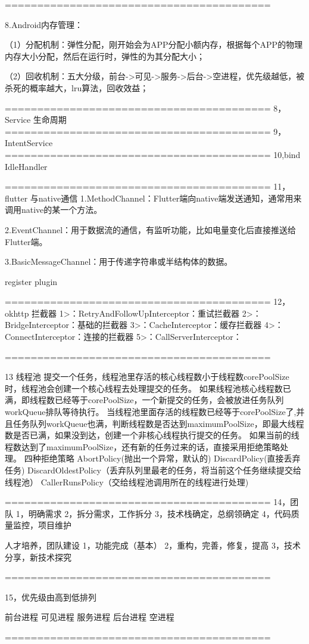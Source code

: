  =========================================

8.Android内存管理：

（1）分配机制：弹性分配，刚开始会为APP分配小额内存，根据每个APP的物理内存大小分配，然后在运行时，弹性的为其分配大小；

（2）回收机制：五大分级，前台->可见->服务->后台->空进程，优先级越低，被杀死的概率越大，lru算法，回收效益；



 =========================================
8，Service 生命周期
 =========================================
9，IntentService
 =========================================
10,bind   IdleHandler

 =========================================
11，flutter 与native通信
1.MethodChannel：Flutter端向native端发送通知，通常用来调用native的某一个方法。

2.EventChannel：用于数据流的通信，有监听功能，比如电量变化后直接推送给Flutter端。

3.BasicMessageChannel：用于传递字符串或半结构体的数据。

register plugin


 =========================================
12， okhttp 拦截器
     1>：RetryAndFollowUpInterceptor：重试拦截器
     2>：BridgeInterceptor：基础的拦截器
     3>：CacheInterceptor：缓存拦截器
     4>：ConnectInterceptor：连接的拦截器
     5>：CallServerInterceptor：





=========================================

13 线程池
提交一个任务，线程池里存活的核心线程数小于线程数corePoolSize时，线程池会创建一个核心线程去处理提交的任务。
如果线程池核心线程数已满，即线程数已经等于corePoolSize，一个新提交的任务，会被放进任务队列workQueue排队等待执行。
当线程池里面存活的线程数已经等于corePoolSize了,并且任务队列workQueue也满，判断线程数是否达到maximumPoolSize，即最大线程数是否已满，如果没到达，创建一个非核心线程执行提交的任务。
如果当前的线程数达到了maximumPoolSize，还有新的任务过来的话，直接采用拒绝策略处理。
四种拒绝策略
AbortPolicy(抛出一个异常，默认的)
DiscardPolicy(直接丢弃任务)
DiscardOldestPolicy（丢弃队列里最老的任务，将当前这个任务继续提交给线程池）
CallerRunsPolicy（交给线程池调用所在的线程进行处理)

=========================================
14，团队
1，明确需求
2，拆分需求，工作拆分
3，技术栈确定，总纲领确定
4，代码质量监控，项目维护

人才培养，团队建设
1，功能完成（基本）
2，重构，完善，修复，提高
3，技术分享，新技术探究

=========================================


15，优先级由高到低排列

前台进程
可见进程
服务进程
后台进程
空进程

=========================================